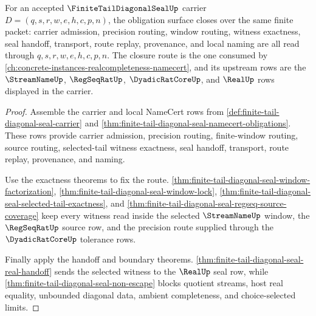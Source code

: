 \begin{theorem}
\label{thm:finitetaildiagonalseal-obligation-closure}
For an accepted $\FiniteTailDiagonalSealUp$ carrier $D=(q,s,r,w,e,h,c,p,n)$, the obligation surface closes over the same finite packet: carrier admission, precision routing, window routing, witness exactness, seal handoff, transport, route replay, provenance, and local naming are all read through $q,s,r,w,e,h,c,p,n$. The closure route is the one consumed by \autoref{ch:concrete-instances-realcompleteness-namecert}, and its upstream rows are the $\StreamNameUp$, $\RegSeqRatUp$, $\DyadicRatCoreUp$, and $\RealUp$ rows displayed in the carrier.
\end{theorem}
\begin{proof}
Assemble the carrier and local NameCert rows from \autoref{def:finite-tail-diagonal-seal-carrier} and \autoref{thm:finite-tail-diagonal-seal-namecert-obligations}. These rows provide carrier admission, precision routing, finite-window routing, source routing, selected-tail witness exactness, seal handoff, transport, route replay, provenance, and naming.

Use the exactness theorems to fix the route. \autoref{thm:finite-tail-diagonal-seal-window-factorization}, \autoref{thm:finite-tail-diagonal-seal-window-lock}, \autoref{thm:finite-tail-diagonal-seal-selected-tail-exactness}, and \autoref{thm:finite-tail-diagonal-seal-regseq-source-coverage} keep every witness read inside the selected $\StreamNameUp$ window, the $\RegSeqRatUp$ source row, and the precision route supplied through the $\DyadicRatCoreUp$ tolerance rows.

Finally apply the handoff and boundary theorems. \autoref{thm:finite-tail-diagonal-seal-real-handoff} sends the selected witness to the $\RealUp$ seal row, while \autoref{thm:finite-tail-diagonal-seal-non-escape} blocks quotient streams, host real equality, unbounded diagonal data, ambient completeness, and choice-selected limits.
\end{proof}

